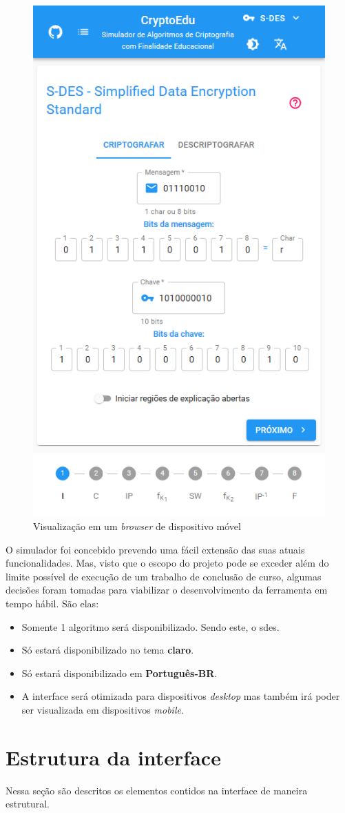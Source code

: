 \begin{figure}[H]
    \centering
    \caption{Visualização em um \textit{browser} de dispositivo móvel}
    \label{fig:simuladormobile}
    \includegraphics[width=0.5\linewidth]{UI/UIMobile.png}
\end{figure}

O simulador foi concebido prevendo uma fácil extensão das suas atuais funcionalidades. Mas, visto que o escopo do projeto pode se exceder além do limite possível de execução de um trabalho de conclusão de curso, algumas decisões foram tomadas para viabilizar o desenvolvimento da ferramenta em tempo hábil. São elas:

\begin{itemize}
    \item Somente 1 algoritmo será disponibilizado. Sendo este, o \acrfull{sdes}.
    \item Só estará disponibilizado no tema \textbf{claro}.
    \item Só estará disponibilizado em \textbf{Português-BR}.
    \item A interface será otimizada para dispositivos \textit{desktop} mas também irá poder ser visualizada em dispositivos \textit{mobile}.
\end{itemize}

\section{Estrutura da interface}
Nessa seção são descritos os elementos contidos na interface de maneira estrutural.

